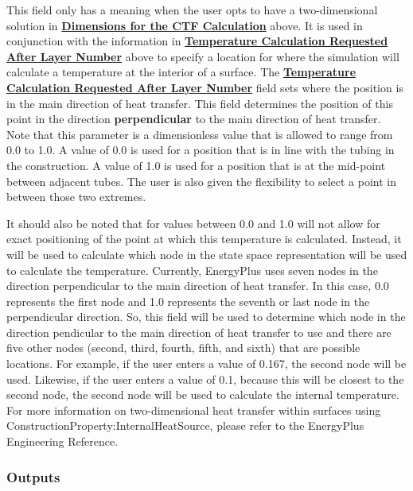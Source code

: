 This field only has a meaning when the user opts to have a two-dimensional solution in \textbf{\hyperref[field-dimensions-for-the-ctf-calculation]{Dimensions for the CTF Calculation}} above.  It is used in conjunction with the information in \textbf{\hyperref[field-temperature-calculation-requested-after-layer-number]{Temperature Calculation Requested After Layer Number}} above to specify a location for where the simulation will calculate a temperature at the interior of a surface.  The \textbf{\hyperref[field-temperature-calculation-requested-after-layer-number]{Temperature Calculation Requested After Layer Number}} field sets where the position is in the main direction of heat transfer.  This field determines the position of this point in the direction \textbf{perpendicular} to the main direction of heat transfer.  Note that this parameter is a dimensionless value that is allowed to range from 0.0 to 1.0.  A value of 0.0 is used for a position that is in line with the tubing in the construction.  A value of 1.0 is used for a position that is at the mid-point between adjacent tubes.  The user is also given the flexibility to select a point in between those two extremes.

It should also be noted that for values between 0.0 and 1.0 will not allow for
exact positioning of the point at which this temperature is calculated.
Instead, it will be used to calculate which node in the state space
representation will be used to calculate the temperature.  Currently,
EnergyPlus uses seven nodes in the direction perpendicular to the main
direction of heat transfer.  In this case, 0.0 represents the first node and
1.0 represents the seventh or last node in the perpendicular direction.  So,
this field will be used to determine which node in the direction pendicular to
the main direction of heat transfer to use and there are five other nodes
(second, third, fourth, fifth, and sixth) that are possible locations.  For
example, if the user enters a value of 0.167, the second node will be used.
Likewise, if the user enters a value of 0.1, because this will be closest to
the second node, the second node will be used to calculate the internal
temperature.  For more information on two-dimensional heat transfer within
surfaces using ConstructionProperty:InternalHeatSource, please refer to the
EnergyPlus Engineering Reference.

\subsubsection{Outputs}\label{outputs-36-1}

